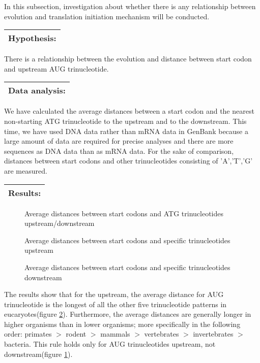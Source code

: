 In this subsection, investigation about whether there is any
relationship between evolution and translation initiation mechanism
will be conducted.

\vspace{2ex}
\noindent
\begin{tabular}{|l|}
\hline
Hypothesis:\\
\hline
\end{tabular}

There is a relationship between the evolution and distance between
start codon and upstream AUG trinucleotide.

\vspace{2ex}
\noindent
\begin{tabular}{|l|}
\hline
Data analysis:\\
\hline
\end{tabular}

We have calculated the average distances between a start codon and the nearest
non-starting ATG trinucleotide to the upstream and to the
downstream. This time, we have used DNA data rather than mRNA data in
GenBank because a large amount of data are required for precise
analyses and there are more sequences as DNA data than as mRNA data.
For the sake of comparison, distances between  start codons and other
trinucleotides consisting of 'A','T','G' are measured.

\vspace{2ex}
\noindent
\begin{tabular}{|l|}
\hline
Results:\\
\hline
\end{tabular}

\begin{figure}
\caption{Average distances between start codons and ATG trinucleotides 
upstream/downstream}
\label{atg_dod2}
\end{figure}

\begin{figure}
\caption{Average distances between start codons and specific
trinucleotides upstream}
\label{atg_dist}
\end{figure}

\begin{figure}
\caption{Average distances between start codons and specific
trinucleotides downstream}
\label{atg_disd}
\end{figure}

The results show that for the upstream, the average distance
for AUG trinucleotide is the longest of all the other 
five trinucleotide patterns in eucaryotes(figure \ref{atg_dist}).
Furthermore, the average distances 
are generally longer in higher organisms
than in lower organisms; more specifically in the following order:
primates $>$ rodent $>$ mammals $>$ vertebrates $>$ invertebrates $>$
bacteria.  This rule  holds only  for AUG trinucleotides upstream,
not downstream(figure \ref{atg_dod2}).


